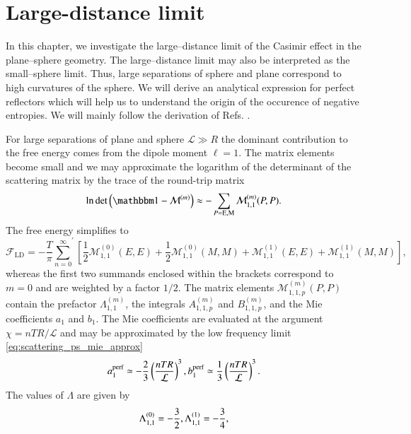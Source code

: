 \chapter{Large-distance limit}
\label{chapter_ld}

In this chapter, we investigate the large--distance limit of the Casimir effect
in the plane--sphere geometry. The large--distance limit may also be
interpreted as the small--sphere limit. Thus, large separations of sphere and
plane correspond to high curvatures of the sphere. We will derive an analytical
expression for perfect reflectors which will help us to understand the origin of
the occurence of negative entropies. We will mainly follow the derivation of
Refs. \cite{Durand,ThermalCasimirEffect}.

For large separations of plane and sphere $\mathcal{L} \gg R$ the dominant
contribution to the free energy comes from the dipole moment $\ell = 1$.  The
matrix elements become small and we may approximate the logarithm of the
determinant of the scattering matrix by the trace of the round-trip matrix
\begin{equation}
\log \det \left( \Id - \mathcal{M}^{(m)} \right) \approx - \sum_{P=\PE,\PM} \mathcal{M}_{1,1}^{(m)}(P,P).
\end{equation}
The free energy simplifies to
\begin{equation}
\label{eq:ld_F1}
\mathcal{F}_\text{LD} = - \frac{T}{\pi} {\sum_{n=0}^\infty}^\prime \left[ \frac{1}{2} \mathcal{M}_{1,1}^{(0)}(E,E) + \frac{1}{2} \mathcal{M}_{1,1}^{(0)}(M,M) + \mathcal{M}_{1,1}^{(1)}(E,E) + \mathcal{M}_{1,1}^{(1)}(M,M) \right],
\end{equation}
whereas the first two summands enclosed within the brackets correspond to $m=0$
and are weighted by a factor $1/2$.
The matrix elements $\mathcal{M}^{(m)}_{1,1,p}(P,P)$ contain the prefactor
$\Lambda_{1,1}^{(m)}$, the integrals $A_{1,1,p}^{(m)}$ and $B_{1,1,p}^{(m)}$, and
the Mie coefficients $a_1$ and $b_1$. The Mie coefficients are evaluated at
the argument $\chi = nTR/\mathcal{L}$ and may be approximated by the low frequency limit
\eqref{eq:scattering_ps_mie_approx}
\begin{equation}
\label{eq:ld_mie}
a_1^\text{perf} \simeq - \frac{2}{3} \left(\frac{nTR}{\mathcal{L}}\right)^3, \\
b_1^\text{perf} \simeq   \frac{1}{3} \left(\frac{nTR}{\mathcal{L}}\right)^3.
\end{equation}
The values of $\Lambda$ are given by
\begin{equation}
\label{eq:ld_lambda}
\Lambda_{1,1}^{(0)} = -\frac{3}{2}, \\
\Lambda_{1,1}^{(1)} = -\frac{3}{4},
\end{equation}
